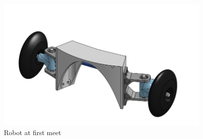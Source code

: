 \begin{figure}[ht]
\hfill%
\begin{minipage}[b]{.48\textwidth}
  \centering
  \includegraphics[width=0.95\textwidth]{Meetings/October/10-22-22/10-2-22_CAD_Figure3.PNG}
  \caption{Robot at first meet}
  \label{fig:pic2}
\end{minipage}
\end{figure}

